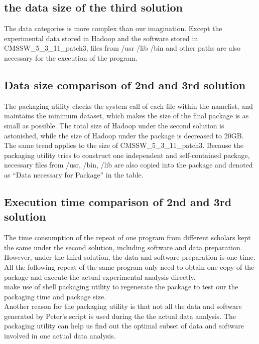\documentclass{article}
\begin{document}
\subsection{ the data size of the third solution}
The data categories is more complex than our imagination. Except the experimental data stored in Hadoop and the software stored in CMSSW\_5\_3\_11\_patch3, files from /usr /lib /bin and other paths are also necessary for the execution of the program.\\

\subsection{ Data size comparison of 2nd and 3rd solution}
The packaging utility checks the system call of each file within the namelist, and maintains the minimum dataset, which makes the size of the final package is as small as possible. The total size of Hadoop under the second solution is astonished, while the size of Hadoop under the package is decreased to 20GB. The same trend applies to the size of CMSSW\_5\_3\_11\_patch3. Because the packaging utility tries to construct one independent and self-contained package, necessary files  from /usr, /bin, /lib are also copied into the package and denoted as “Data necessary for Package” in the table.\\ 

\subsection{Execution time comparison of 2nd and 3rd solution}
The time consumption of the repeat of one program from different scholars kept the same under the second solution, including software and data preparation. However, under the third solution, the data and software preparation is one-time. All the following repeat of the same program only need to obtain one copy of the package and execute the actual experimental analysis directly.\\

make use of shell packaging utility to regenerate the package to test our the packaging time and package size.\\

Another reason for the packaging utility is that not all the data and software generated by Peter’s script is used during the the actual data analysis. The packaging utility can help us find out the optimal subset of data and software involved in one actual data analysis. \\
\end{document}

